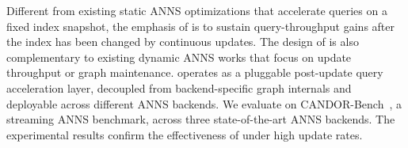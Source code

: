 Different from existing static ANNS optimizations that accelerate queries on a fixed index snapshot, the emphasis of \system is to sustain query-throughput gains after the index has been changed by continuous updates.
The design of \system is also complementary to existing dynamic ANNS works that focus on update throughput or graph maintenance. \system operates as a pluggable post-update query acceleration layer, decoupled from backend-specific graph internals and deployable across different ANNS backends. We evaluate \system on CANDOR-Bench~\cite{Wang202627}, a streaming ANNS benchmark, across three state-of-the-art ANNS backends. The experimental results confirm the effectiveness of \system under high update rates.




